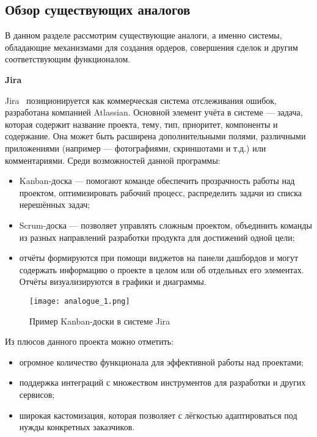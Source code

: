 \subsection{Обзор существующих аналогов}\label{sec:analysis:analogues}

В данном разделе рассмотрим существующие аналоги, а именно системы, обладающие механизмами для создания ордеров, совершения сделок и другим соответствующим функционалом.

\textbf{Jira}

Jira~\cite{analogue_1} позиционируется как коммерческая система отслеживания ошибок, разработана компанией Atlassian. Основной элемент учёта в системе — задача, которая содержит название проекта, тему, тип, приоритет, компоненты и содержание. Она может быть расширена дополнительными полями, различными приложениями (например — фотографиями, скриншотами и т.д.) или комментариями. Среди возможностей данной программы:
\begin{itemize}
    \item Kanban-доска — помогают команде обеспечить прозрачность работы над проектом, оптимизировать рабочий процесс, распределить задачи из списка нерешённых задач;
    \item Scrum-доска — позволяет управлять сложным проектом, объединить команды из разных направлений разработки продукта для достижений одной цели;
    \item отчёты формируются при помощи виджетов на панели дашбордов и могут содержать информацию о проекте в целом или об отдельных его элементах. Отчёты визуализируются в графики и диаграммы.
\end{itemize}

\begin{figure}[ht]
    \centering
	\texttt{[image: analogue\_1.png]}
	\caption{Пример Kanban-доски в системе Jira}\label{fig:analysis:analogue_1:picture}
\end{figure}

Из плюсов данного проекта можно отметить:
\begin{itemize}
    \item огромное количество функционала для эффективной работы над проектами;
    \item поддержка интеграций с множеством инструментов для разработки и других сервисов;
    \item широкая кастомизация, которая позволяет с лёгкостью адаптироваться под нужды конкретных заказчиков.
\end{itemize}

